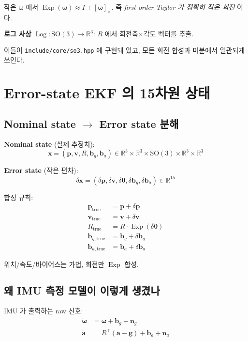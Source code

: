 \documentclass[11pt,a4paper,oneside]{report}
\newcommand{\R}{\mathbb{R}}
\newcommand{\SO}{\mathrm{SO}}
\newcommand{\T}{^{\!\top}}
\newcommand{\skewop}[1]{[#1]_{\!\times}}
\DeclareMathOperator{\Exp}{Exp}
\DeclareMathOperator{\Log}{Log}
\begin{document}
작은 \(\bm{\omega}\) 에서 \(\Exp(\bm{\omega}) \approx I + \skewop{\bm{\omega}}\). 즉 \emph{first-order Taylor 가 정확히 작은 회전} 이다.

\textbf{로그 사상} \(\Log : \SO(3) \to \R^3\): \(R\) 에서 회전축\(\times\)각도 벡터를 추출.

이들이 \texttt{include/core/so3.hpp} 에 구현돼 있고, 모든 회전 합성과 미분에서 일관되게 쓰인다.

\section{Error-state EKF 의 15차원 상태}

\subsection{Nominal state \(\to\) Error state 분해}

\textbf{Nominal state} (실제 추정치):
\begin{equation}
\bm{x} = (\bm{p}, \bm{v}, R, \bm{b}_g, \bm{b}_a) \in \R^3 \times \R^3 \times \SO(3) \times \R^3 \times \R^3
\end{equation}

\textbf{Error state} (작은 편차):
\begin{equation}
\delta\bm{x} = (\delta\bm{p}, \delta\bm{v}, \delta\bm{\theta}, \delta\bm{b}_g, \delta\bm{b}_a) \in \R^{15}
\end{equation}

합성 규칙:
\begin{align*}
\bm{p}_{\text{true}} &= \bm{p} + \delta\bm{p} \\
\bm{v}_{\text{true}} &= \bm{v} + \delta\bm{v} \\
R_{\text{true}} &= R \cdot \Exp(\delta\bm{\theta}) \\
\bm{b}_{g,\text{true}} &= \bm{b}_g + \delta\bm{b}_g \\
\bm{b}_{a,\text{true}} &= \bm{b}_a + \delta\bm{b}_a
\end{align*}

위치/속도/바이어스는 가법, 회전만 \(\Exp\) 합성.

\subsection{왜 IMU 측정 모델이 이렇게 생겼나}

IMU 가 출력하는 raw 신호:
\begin{align}
\tilde{\bm{\omega}} &= \bm{\omega} + \bm{b}_g + \bm{n}_g \\
\tilde{\bm{a}} &= R\T(\bm{a} - \bm{g}) + \bm{b}_a + \bm{n}_a
\end{align}
\end{document}

